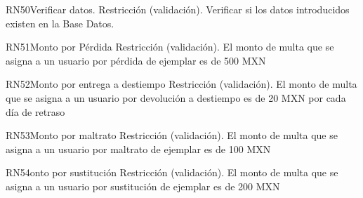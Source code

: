 \begin{BussinesRule}{RN50}{Verificar datos.}
	\BRitem[Tipo:] Restricción (validación).
	\BRitem[Descripción:] Verificar si los datos introducidos existen en la Base Datos.
\end{BussinesRule}

\begin{BussinesRule}{RN51}{Monto por Pérdida}
	\BRitem[Tipo:] Restricción (validación).
	\BRitem[Descripción:] El monto de multa que se asigna a un usuario por pérdida de ejemplar es de 500 MXN
\end{BussinesRule}

\begin{BussinesRule}{RN52}{Monto por entrega a destiempo}
	\BRitem[Tipo:] Restricción (validación).
	\BRitem[Descripción:] El monto de multa que se asigna a un usuario por devolución a destiempo es de 20 MXN por cada día de retraso
\end{BussinesRule}

\begin{BussinesRule}{RN53}{Monto por maltrato}
	\BRitem[Tipo:] Restricción (validación).
	\BRitem[Descripción:] El monto de multa que se asigna a un usuario por maltrato de ejemplar es de 100 MXN
\end{BussinesRule}

\begin{BussinesRule}{RN54}{onto por sustitución}
	\BRitem[Tipo:] Restricción (validación).
	\BRitem[Descripción:] El monto de multa que se asigna a un usuario por sustitución de ejemplar es de 200 MXN
\end{BussinesRule}


